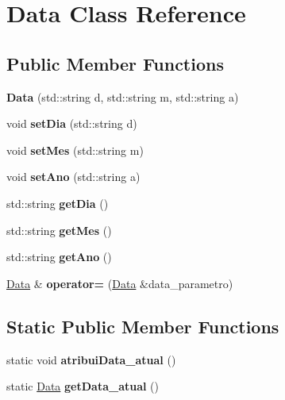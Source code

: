 \hypertarget{classData}{}\section{Data Class Reference}
\label{classData}
\subsection*{Public Member Functions}
\begin{DoxyCompactItemize}
\item 
\mbox{\label{classData_a44fa3d7588f7889702548999d483a837}} 
{\bfseries Data} (std\+::string d, std\+::string m, std\+::string a)
\item 
\mbox{\label{classData_a68add8dbe54f67c2ea17a922a034db7f}} 
void {\bfseries set\+Dia} (std\+::string d)
\item 
\mbox{\label{classData_a9d56b69c7e5d4549480141f1e44f1f88}} 
void {\bfseries set\+Mes} (std\+::string m)
\item 
\mbox{\label{classData_a2b3d2251d25ceea81a186b51753bfac4}} 
void {\bfseries set\+Ano} (std\+::string a)
\item 
\mbox{\label{classData_acc165db7fc800b1246ee00023ed32a41}} 
std\+::string {\bfseries get\+Dia} ()
\item 
\mbox{\label{classData_a8d4dbd9f8804c06b29bc4dc9690af7de}} 
std\+::string {\bfseries get\+Mes} ()
\item 
\mbox{\label{classData_a2a628912345721ce77619c05e8dbc05a}} 
std\+::string {\bfseries get\+Ano} ()
\item 
\mbox{\label{classData_ada239f92c96a269127ba4f27cbdfb7d3}} 
\hyperlink{classData}{Data} \& {\bfseries operator=} (\hyperlink{classData}{Data} \&data\+\_\+parametro)
\end{DoxyCompactItemize}
\subsection*{Static Public Member Functions}
\begin{DoxyCompactItemize}
\item 
\mbox{\label{classData_a6a4b594762dda5ff205670ea1f1418f4}} 
static void {\bfseries atribui\+Data\+\_\+atual} ()
\item 
\mbox{\label{classData_a415f4553dd4f9cf110e23f72c0b888b5}} 
static \hyperlink{classData}{Data} {\bfseries get\+Data\+\_\+atual} ()
\end{DoxyCompactItemize}
